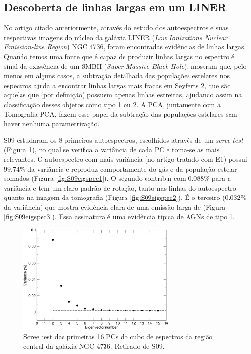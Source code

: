 \subsection{Descoberta de linhas largas em um LINER}

No artigo citado anteriormente, através do estudo dos autoespectros e suas respectivas imagens do núcleo da galáxia
LINER ({\em Low Ionizations Nuclear Emission-line Region}) NGC 4736, foram encontradas evidências de linhas largas.
Quando temos uma fonte que é capaz de produzir linhas largas no espectro é sinal da existência de um SMBH ({\em Super
Massive Black Hole}). \citet{CidFernandes2004} mostram que, pelo menos em alguns casos, a subtração detalhada das
populações estelares nos espectros ajuda a encontrar linhas largas mais fracas em Seyferts 2, que são aquelas que (por
definição) possuem apenas linhas estreitas, ajudando assim na classificação desses objetos como tipo 1 ou 2. A PCA,
juntamente com a Tomografia PCA, fazem esse papel da subtração das populações estelares sem haver nenhuma
parametrização.

S09 estudaram os 8 primeiros autoespectros, escolhidos através de um {\em scree test} (Figura \ref{fig:S09scree}),
no qual se verifica a variância de cada PC e toma-se as mais relevantes. O autoespectro com mais variância (no artigo
tratado com E1) possui $99.74\%$ da variância e reproduz comportamento do gás e da população estelar somados (Figura
\ref{fig:S09eigspec1}). O segundo contribui com $0.088\%$ para a variância e tem um claro padrão de rotação, tanto
nas linhas do autoespectro quanto na imagem da tomografia (Figura \ref{fig:S09eigspec2}). É o terceiro ($0.032\%$
da variância) que mostra evidência clara de uma emissão larga de \Halpha (Figura \ref{fig:S09eigspec3}). Essa
assinatura é uma evidência tipica de AGNs de tipo 1.

\begin{figure}
    \includegraphics[width=0.7\textwidth]{figuras/figSteiner2009fig1.pdf}
    \caption[{\em Scree test} na galáxia NGC 4736.]
    {Scree test das primeiras 16 PCs do cubo de espectros da região central da galáxia NGC 4736. Retirado de
    S09.}
    \label{fig:S09scree}
\end{figure}

